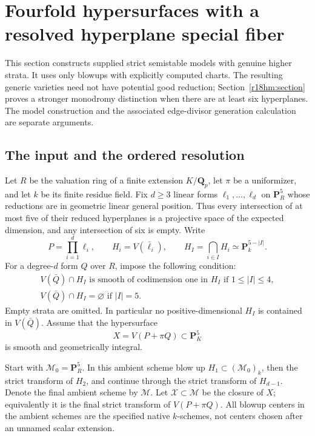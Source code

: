 \section{Fourfold hypersurfaces with a resolved hyperplane special fiber}
\label{r18hp:section}

This section constructs supplied strict semistable models with genuine
higher strata.  It uses only blowups with explicitly computed charts.
The resulting generic varieties need not have potential good reduction;
Section~\ref{r18hm:section} proves a stronger monodromy distinction when
there are at least six hyperplanes.  The model construction and the
associated edge-divisor generation calculation are separate arguments.

\subsection{The input and the ordered resolution}

Let $R$ be the valuation ring of a finite extension $K/\mathbf Q_p$,
let $\pi$ be a uniformizer, and let $k$ be its finite residue field.
Fix $d\ge3$ linear forms $\ell_1,\ldots,\ell_d$ on
$\mathbf P^5_R$ whose reductions are in geometric linear general
position.  Thus every intersection of at most five of their reduced
hyperplanes is a projective space of the expected dimension, and
any intersection of six is empty.  Write
\[
 P=\prod_{i=1}^d\ell_i,\qquad H_i=V(\bar\ell_i),\qquad
 H_I=\bigcap_{i\in I}H_i\simeq\mathbf P_k^{5-|I|}.
 \tag{HP18.1}\label{r18hp:arrangement}
\]
For a degree-$d$ form $Q$ over $R$, impose the following condition:
\[
 \begin{array}{l}
 V(\bar Q)\cap H_I\text{ is smooth of codimension one in }H_I
       \text{ if }1\le |I|\le4,\\
 V(\bar Q)\cap H_I=\varnothing\text{ if }|I|=5.
 \end{array}
 \tag{HP18.2}\label{r18hp:transverse}
\]
Empty strata are omitted.  In particular no positive-dimensional
$H_I$ is contained in $V(\bar Q)$.  Assume that the hypersurface
\[
                  X=V(P+\pi Q)\subset\mathbf P^5_K
 \tag{HP18.3}\label{r18hp:generic}
\]
is smooth and geometrically integral.

Start with $\mathcal M_0=\mathbf P^5_R$.  In this ambient scheme
blow up $H_1\subset(\mathcal M_0)_k$, then the strict transform
of $H_2$, and continue through the strict transform of $H_{d-1}$.
Denote the final ambient scheme by $\mathcal M$.  Let
$\mathcal X\subset\mathcal M$ be the closure of $X$; equivalently
it is the final strict transform of $V(P+\pi Q)$.
All blowup centers in the ambient schemes are the specified native
$k$-schemes, not centers chosen after an unnamed scalar extension.

